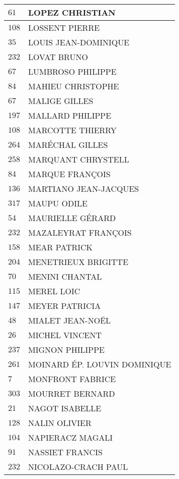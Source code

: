 \begin{xltabular}{\linewidth}{|l|X|}
    $61$ & LOPEZ CHRISTIAN \\
    \hline
    $108$ & LOSSENT PIERRE \\
    \hline
    $35$ & LOUIS JEAN-DOMINIQUE \\
    \hline
    $232$ & LOVAT BRUNO \\
    \hline
    $67$ & LUMBROSO PHILIPPE \\
    \hline
    $84$ & MAHIEU CHRISTOPHE \\
    \hline
    $67$ & MALIGE GILLES \\
    \hline
    $197$ & MALLARD PHILIPPE \\
    \hline
    $108$ & MARCOTTE THIERRY \\
    \hline
    $264$ & MARÉCHAL GILLES \\
    \hline
    $258$ & MARQUANT CHRYSTELL \\
    \hline
    $84$ & MARQUE FRANÇOIS \\
    \hline
    $136$ & MARTIANO JEAN-JACQUES \\
    \hline
    $317$ & MAUPU ODILE \\
    \hline
    $54$ & MAURIELLE GÉRARD \\
    \hline
    $232$ & MAZALEYRAT FRANÇOIS \\
    \hline
    $158$ & MEAR PATRICK \\
    \hline
    $204$ & MENETRIEUX BRIGITTE \\
    \hline
    $70$ & MENINI CHANTAL \\
    \hline
    $115$ & MEREL LOIC \\
    \hline
    $147$ & MEYER PATRICIA \\
    \hline
    $48$ & MIALET JEAN-NOËL \\
    \hline
    $26$ & MICHEL VINCENT \\
    \hline
    $237$ & MIGNON PHILIPPE \\
    \hline
    $261$ & MOINARD ÉP. LOUVIN DOMINIQUE \\
    \hline
    $7$ & MONFRONT FABRICE \\
    \hline
    $303$ & MOURRET BERNARD \\
    \hline
    $21$ & NAGOT ISABELLE \\
    \hline
    $128$ & NALIN OLIVIER \\
    \hline
    $104$ & NAPIERACZ MAGALI \\
    \hline
    $91$ & NASSIET FRANCIS \\
    \hline
    $232$ & NICOLAZO-CRACH PAUL \\

\end{xltabular}
